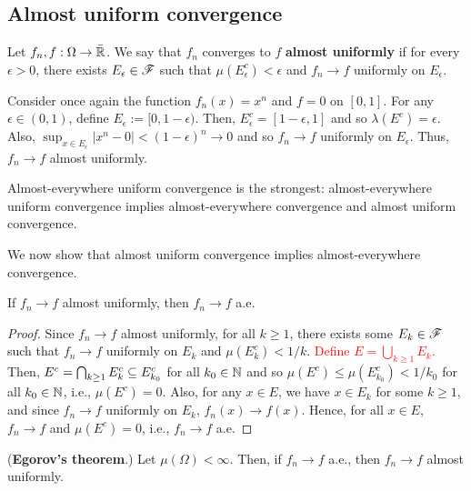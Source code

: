 \subsection{Almost uniform convergence}

\begin{definition}
    Let $f_n, f : \Omega \to \bar{\mathbb{R}}$. We say that $f_n$ converges to $f$ \textbf{almost uniformly} if for every $\epsilon > 0$, there exists $E_\epsilon \in \mathscr{F}$ such that $\mu(E_\epsilon^c) < \epsilon$ and $f_n \to f$ uniformly on $E_\epsilon$.
\end{definition}

\begin{example}
    Consider once again the function $f_n(x) = x^n$ and $f = 0$ on $[0, 1]$. For any $\epsilon \in (0, 1)$, define $E_\epsilon := [0, 1 - \epsilon)$. Then, $E_\epsilon^c = [1 - \epsilon, 1]$ and so $\lambda(E^c) = \epsilon$. Also, $\sup_{x \in E_\epsilon} |x^n - 0| < (1 - \epsilon)^n \to 0$ and so $f_n \to f$ uniformly on $E_\epsilon$. Thus, $f_n \to f$ almost uniformly.
\end{example}

\begin{remark}
    Almost-everywhere uniform convergence is the strongest: almost-everywhere uniform convergence implies almost-everywhere convergence and almost uniform convergence. 
\end{remark}

We now show that almost uniform convergence implies almost-everywhere convergence.

\begin{lemma}
    If $f_n \to f$ almost uniformly, then $f_n \to f$ a.e.
\end{lemma}

\begin{proof}
    Since $f_n \to f$ almost uniformly, for all $k \geq 1$, there exists some $E_k \in \mathscr{F}$ such that $f_n \to f$ uniformly on $E_k$ and $\mu(E_k^c) < 1/k$. \textcolor{red}{Define $E = \bigcup_{k \geq 1} E_k$.} Then, $E^c = \bigcap_{k \geq 1} E_k^c \subseteq E_{k_0}^c$ for all $k_0 \in \mathbb{N}$ and so $\mu(E^c) \leq \mu(E_{k_0}^c) < 1/k_0$ for all $k_0 \in \mathbb{N}$, i.e., $\mu(E^c) = 0$. Also, for any $x \in E$, we have $x \in E_k$ for some $k \geq 1$, and since $f_n \to f$ uniformly on $E_k$, $f_n(x) \to f(x)$. Hence, for all $x \in E$, $f_n \to f$ and $\mu(E^c) = 0$, i.e., $f_n \to f$ a.e.
\end{proof}

\begin{theorem}
    (\textbf{Egorov's theorem}.) Let $\mu(\Omega) < \infty$. Then, if $f_n \to f$ a.e., then $f_n \to f$ almost uniformly. 
\end{theorem}

